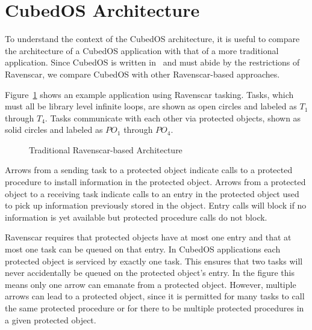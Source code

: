 
\section{CubedOS Architecture}
\label{section-architecture}

To understand the context of the CubedOS architecture, it is useful to compare the architecture
of a CubedOS application with that of a more traditional application. Since CubedOS is written
in \SPARK\ and must abide by the restrictions of Ravenscar, we compare CubedOS with other
Ravenscar-based approaches.

Figure~\ref{fig:traditional-architecture} shows an example application using Ravenscar tasking.
Tasks, which must all be library level infinite loops, are shown as open circles and labeled as
$T_1$ through $T_4$. Tasks communicate with each other via protected objects, shown as solid
circles and labeled as $PO_1$ through $PO_4$.

\begin{figure}[tbhp]
  \center
  \caption{Traditional Ravenscar-based Architecture}
  \label{fig:traditional-architecture}
\end{figure}

Arrows from a sending task to a protected object indicate calls to a protected procedure to
install information in the protected object. Arrows from a protected object to a receiving task
indicate calls to an entry in the protected object used to pick up information previously stored
in the object. Entry calls will block if no information is yet available but protected procedure
calls do not block.

Ravenscar requires that protected objects have at most one entry and that at most one task can
be queued on that entry. In CubedOS applications each protected object is serviced by exactly
one task. This ensures that two tasks will never accidentally be queued on the protected
object's entry. In the figure this means only one arrow can emanate from a protected object.
However, multiple arrows can lead to a protected object, since it is permitted for many tasks to
call the same protected procedure or for there to be multiple protected procedures in a given
protected object.

